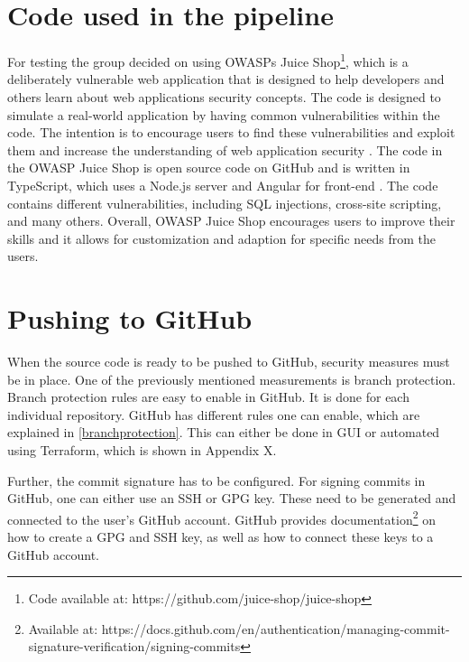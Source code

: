 \section{Code used in the pipeline}
For testing the group decided on using OWASPs Juice Shop\footnote{Code available at: https://github.com/juice-shop/juice-shop}, which is a deliberately vulnerable web application that is designed to help developers and others learn about web applications security concepts. The code is designed to simulate a real-world application by having common vulnerabilities within the code. The intention is to encourage users to find these vulnerabilities and exploit them and increase the understanding of web application security \cite{owaspJuiceShop}.
The code in the OWASP Juice Shop is open source code on GitHub and is written in TypeScript, which uses a Node.js server and Angular for \gls{front-end} \cite{owaspJuiceShopCode}.
The code contains different vulnerabilities, including SQL injections, cross-site scripting, and many others. 
Overall, OWASP Juice Shop encourages users to improve their skills and it allows for customization and adaption for specific needs from the users. 

\section{Pushing to GitHub}
When the source code is ready to be pushed to GitHub, security measures must be in place. One of the previously mentioned measurements is branch protection. Branch protection rules are easy to enable in GitHub. It is done for each individual repository. GitHub has different rules one can enable, which are explained in \ref{branchprotection}. This can either be done in \gls{GUI} or automated using Terraform, which is shown in Appendix X. 

Further, the commit signature has to be configured. For signing commits in GitHub, one can either use an SSH or GPG key. These need to be generated and connected to the user's GitHub account.
GitHub provides documentation\footnote{Available at: https://docs.github.com/en/authentication/managing-commit-signature-verification/signing-commits} on how to create a GPG and SSH key, as well as how to connect these keys to a GitHub account.

